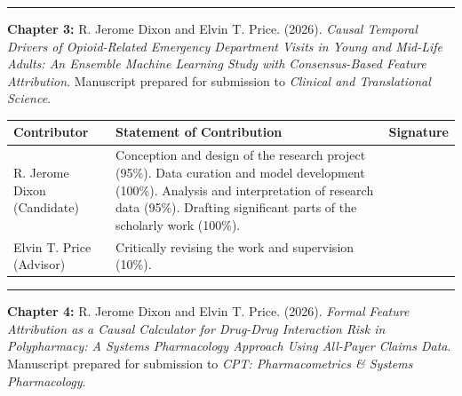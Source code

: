 \documentclass[
  12pt,
]{book}
\begin{document}
\begin{center}\rule{0.5\linewidth}{0.5pt}\end{center}

\textbf{Chapter 3:} R. Jerome Dixon and Elvin T. Price. (2026).
\emph{Causal Temporal Drivers of Opioid-Related Emergency Department
Visits in Young and Mid-Life Adults: An Ensemble Machine Learning Study
with Consensus-Based Feature Attribution}. Manuscript prepared for
submission to \emph{Clinical and Translational Science}.

\begin{longtable}[]{@{}
  >{\raggedright\arraybackslash}p{}
  >{\raggedright\arraybackslash}p{}
  >{\raggedright\arraybackslash}p{}@{}}
\toprule\noalign{}
\begin{minipage}[b]{\linewidth}\raggedright
Contributor
\end{minipage} & \begin{minipage}[b]{\linewidth}\raggedright
Statement of Contribution
\end{minipage} & \begin{minipage}[b]{\linewidth}\raggedright
Signature
\end{minipage} \\
\midrule\noalign{}
\endhead
\bottomrule\noalign{}
\endlastfoot
R. Jerome Dixon (Candidate) & Conception and design of the research
project (95\%). Data curation and model development (100\%). Analysis
and interpretation of research data (95\%). Drafting significant parts
of the scholarly work (100\%). & \\
Elvin T. Price (Advisor) & Critically revising the work and supervision
(10\%). & \\
\end{longtable}

\begin{center}\rule{0.5\linewidth}{0.5pt}\end{center}

\textbf{Chapter 4:} R. Jerome Dixon and Elvin T. Price. (2026).
\emph{Formal Feature Attribution as a Causal Calculator for Drug-Drug
Interaction Risk in Polypharmacy: A Systems Pharmacology Approach Using
All-Payer Claims Data}. Manuscript prepared for submission to \emph{CPT:
Pharmacometrics \& Systems Pharmacology}.
\end{document}
